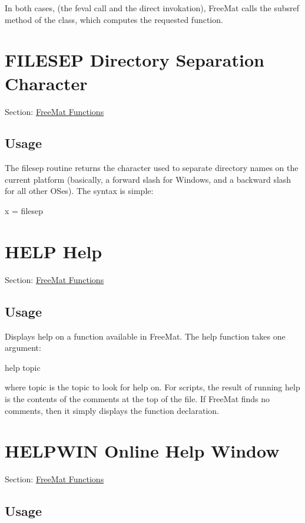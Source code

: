 In both cases, (the {\ttfamily feval} call and the direct invokation), Free\-Mat calls the {\ttfamily subsref} method of the class, which computes the requested function. \hypertarget{freemat_filesep}{}\section{F\-I\-L\-E\-S\-E\-P Directory Separation Character}\label{freemat_filesep}
Section\-: \hyperlink{sec_freemat}{Free\-Mat Functions} \hypertarget{vtkwidgets_vtkxyplotwidget_Usage}{}\subsection{Usage}\label{vtkwidgets_vtkxyplotwidget_Usage}
The {\ttfamily filesep} routine returns the character used to separate directory names on the current platform (basically, a forward slash for Windows, and a backward slash for all other O\-Ses). The syntax is simple\-: \begin{DoxyVerb}  x = filesep
\end{DoxyVerb}
 \hypertarget{freemat_help}{}\section{H\-E\-L\-P Help}\label{freemat_help}
Section\-: \hyperlink{sec_freemat}{Free\-Mat Functions} \hypertarget{vtkwidgets_vtkxyplotwidget_Usage}{}\subsection{Usage}\label{vtkwidgets_vtkxyplotwidget_Usage}
Displays help on a function available in Free\-Mat. The help function takes one argument\-: \begin{DoxyVerb}  help topic
\end{DoxyVerb}
 where {\ttfamily topic} is the topic to look for help on. For scripts, the result of running {\ttfamily help} is the contents of the comments at the top of the file. If Free\-Mat finds no comments, then it simply displays the function declaration. \hypertarget{freemat_helpwin}{}\section{H\-E\-L\-P\-W\-I\-N Online Help Window}\label{freemat_helpwin}
Section\-: \hyperlink{sec_freemat}{Free\-Mat Functions} \hypertarget{vtkwidgets_vtkxyplotwidget_Usage}{}\subsection{Usage}\label{vtkwidgets_vtkxyplotwidget_Usage}
